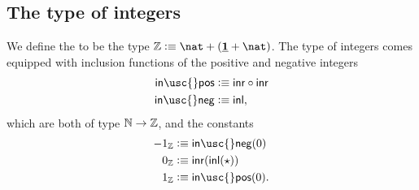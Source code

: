 \begin{comment}
\subsection{Overview of the inductive types}
The following table gives an overview of the 'primitive' inductive types that we have introduced so far. Many types of interest can be defined in terms of these inductive types, along with the identity type which we will introduce in \cref{chap:identity}.
\begin{center}
\begin{tabular}{llll}
\toprule
name & type & constructors \\
\midrule
\define{natural numbers} & $\N$ & $\zeroN:\N$ \\
& & $\succN:\N\to \N$ & \\
\define{empty type} & $\emptyt$ & {\color{black!20}(no constructors)}\\
\define{unit type} & $\unit$ & $\ttt:\unit$ \\
\define{booleans} & $\bool$ & $\bfalse:\bool$ \\
& & $\btrue : \bool$ \\
\define{coproduct} & $A+B$ & $\inl : A \to A+B$ \\
& & $\inr : B\to A+B$ & \\
\define{product} & $A\times B$ & $(\blank,\blank):A\to (B\to A\times B)$ \\
\define{$\Sigma$-type} & $\sm{x:A}B(x)$ & $(\blank,\blank):\prd{y:A} \big(B(y)\to \sm{x:A}B(x)\big)$ \\
\bottomrule
\end{tabular}
\end{center}
\end{comment}

\subsection{The type of integers}

\begin{defn}
  We define the  to be the type $\Z\defeq\nat+(\unit+\nat)$. The type of integers comes equipped with inclusion functions of the positive and negative integers
  \begin{align*}
    \mathsf{in\usc{}pos} & \defeq \inr\circ\inr \\
    \mathsf{in\usc{}neg} & \defeq \inl,
  \end{align*}
  which are both of type ${\mathbb{N}}\to{\mathbb{Z}}$, and the constants
  \begin{align*}
    -1_\Z & \defeq \mathsf{in\usc{}neg}(0)\\
    0_\Z & \defeq \inr(\inl(\ttt))\\
    1_\Z & \defeq \mathsf{in\usc{}pos}(0).
  \end{align*}
\end{defn}

